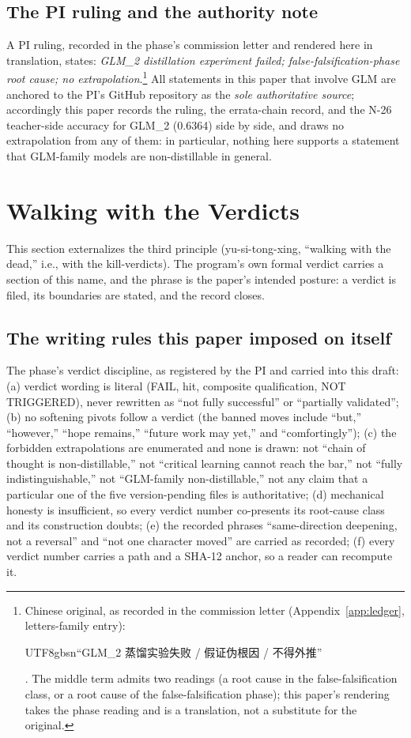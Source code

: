 \documentclass[11pt]{article}
\begin{document}
\subsection{The PI ruling and the authority note}

A PI ruling, recorded in the phase's commission letter and rendered here in translation, states: \emph{GLM\_2 distillation experiment failed; false-falsification-phase root cause; no extrapolation}.\footnote{Chinese original, as recorded in the commission letter (Appendix~\ref{app:ledger}, letters-family entry): \begin{CJK}{UTF8}{gbsn}``GLM\_2 蒸馏实验失败 / 假证伪根因 / 不得外推''\end{CJK}. The middle term admits two readings (a root cause in the false-falsification class, or a root cause of the false-falsification phase); this paper's rendering takes the phase reading and is a translation, not a substitute for the original.} All statements in this paper that involve GLM are anchored to the PI's GitHub repository as the \emph{sole authoritative source}; accordingly this paper records the ruling, the errata-chain record, and the N-26 teacher-side accuracy for GLM\_2 (0.6364) side by side, and draws no extrapolation from any of them: in particular, nothing here supports a statement that GLM-family models are non-distillable in general.

\section{Walking with the Verdicts}\label{sec:walking}

This section externalizes the third principle (yu-si-tong-xing, ``walking with the dead,'' i.e., with the kill-verdicts). The program's own formal verdict carries a section of this name, and the phrase is the paper's intended posture: a verdict is filed, its boundaries are stated, and the record closes.

\subsection{The writing rules this paper imposed on itself}

The phase's verdict discipline, as registered by the PI and carried into this draft: (a) verdict wording is literal (FAIL, hit, composite qualification, NOT TRIGGERED), never rewritten as ``not fully successful'' or ``partially validated''; (b) no softening pivots follow a verdict (the banned moves include ``but,'' ``however,'' ``hope remains,'' ``future work may yet,'' and ``comfortingly''); (c) the forbidden extrapolations are enumerated and none is drawn: not ``chain of thought is non-distillable,'' not ``critical learning cannot reach the bar,'' not ``fully indistinguishable,'' not ``GLM-family non-distillable,'' not any claim that a particular one of the five version-pending files is authoritative; (d) mechanical honesty is insufficient, so every verdict number co-presents its root-cause class and its construction doubts; (e) the recorded phrases ``same-direction deepening, not a reversal'' and ``not one character moved'' are carried as recorded; (f) every verdict number carries a path and a SHA-12 anchor, so a reader can recompute it.
\end{document}
